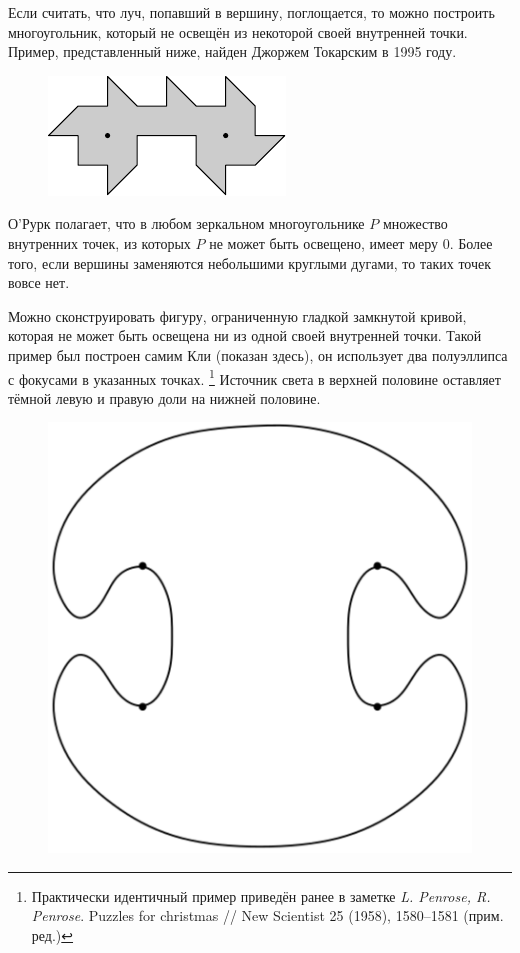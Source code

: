 \documentclass[twoside]{book}
\begin{document}
Если считать, что луч, попавший в вершину, поглощается, то можно построить многоугольник, который не освещён из некоторой своей внутренней точки.
Пример, представленный ниже, найден Джоржем Токарским в 1995 году.

\begin{figure}[!ht]
\centering
\includegraphics{mp/wink-31}
\end{figure} 

О’Рурк полагает, что в любом зеркальном многоугольнике $P$ множество внутренних точек, из которых $P$ не может быть освещено, имеет меру 0.
Более того, если вершины заменяются небольшими круглыми дугами, то таких точек вовсе нет.


Можно сконструировать фигуру, ограниченную гладкой замкнутой кривой, которая не может быть освещена ни из одной своей внутренней точки. 
Такой пример был построен самим Кли (показан здесь), он использует два полуэллипса с фокусами в указанных точках.%
\footnote{Практически идентичный пример приведён ранее в заметке \emph{L. Penrose, R. Penrose}. Puzzles for christmas /\!/ {New Scientist} 25 (1958), 1580--1581 (прим. ред.)}
Источник света в верхней половине оставляет тёмной левую и правую доли на нижней половине.


\begin{figure}[!ht]
\centering
\includegraphics[scale=0.5]{Figs/UnsolvedPuzzles/klee}
\end{figure} 
\end{document}
